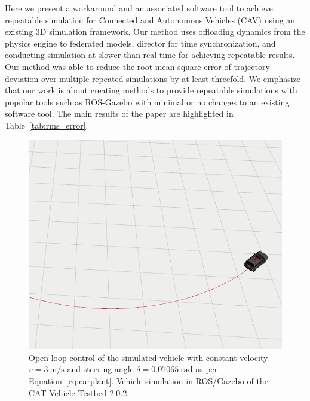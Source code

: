 \documentclass[aps,pra,twocolumn,notitlepage,nofootinbib,superscriptaddress]{revtex4-1}
\begin{document}
Here we present a workaround and an associated software tool to achieve repeatable simulation for Connected and Autonomous Vehicles (CAV) using an existing 3D simulation framework. Our method uses offloading dynamics from the physics engine to federated models, director for time synchronization, and conducting simulation at slower than real-time for achieving repeatable results. Our method was able to reduce the root-mean-square error of trajectory deviation over multiple repeated simulations by at least threefold. We emphasize that our work is about creating methods to provide repeatable simulations with popular tools such as ROS-Gazebo with minimal or no changes to an existing software tool. The main results of the paper are highlighted in Table~\ref{tab:rms_error}.


\begin{figure}[htpb]
\centering
\includegraphics[angle=0,origin=c,trim={0cm 0.0cm 0.0cm 0.0cm},clip,width=0.45\linewidth]{catvehicle_circle.png}
\caption{Open-loop control of the simulated vehicle with constant velocity $v = 3~\textrm{m/s}$ and steering angle $\delta = 0.07065~\textrm{rad}$ as per Equation~\eqref{eq:carplant}. Vehicle simulation in ROS/Gazebo of the CAT Vehicle Testbed 2.0.2.}
\label{fig:catvehicle_circle}
\end{figure}
\end{document}
